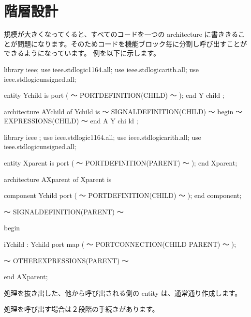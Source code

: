 \documentclass[letterpaper,10pt,dvipdfmx]{sphinxmanual}
\begin{document}
\begin{figure}[htbp]
\centering

\noindent{}
\end{figure}


\section{階層設計}
\label{\detokenize{05_try:id24}}
規模が大きくなってくると、すべてのコードを一つの architecture に書ききることが問題になります。そのためコードを機能ブロック毎に分割し呼び出すことができるようになっています。
例を以下に示します。

\begin{sphinxVerbatim}[commandchars=\\\{\}]
library ieee;
use ieee.std\PYGZus{}logic\PYGZus{}1164.all;
use ieee.std\PYGZus{}logic\PYGZus{}arith.all;
use ieee.std\PYGZus{}logic\PYGZus{}unsigned.all;

entity Y\PYGZus{}child is
  port (
  ～ PORT\PYGZus{}DEFINITION(CHILD) ～
  );
end Y child ;

architecture A\PYGZus{}Y\PYGZus{}child of Y\PYGZus{}child is
  ～ SIGNAL\PYGZus{}DEFINITION(CHILD) ～
begin
  ～ EXPRESSIONS(CHILD) ～
end A Y chi ld ;


library ieee ;
use ieee.std\PYGZus{}logic\PYGZus{}1164.all;
use ieee.std\PYGZus{}logic\PYGZus{}arith.all;
use ieee.std\PYGZus{}logic\PYGZus{}unsigned.all;

entity X\PYGZus{}parent is
  port (
    ～ PORT\PYGZus{}DEFINITION(PARENT) ～
  );
end X\PYGZus{}parent;

architecture A\PYGZus{}X\PYGZus{}parent of X\PYGZus{}parent is

  component Y\PYGZus{}child
    port (
      ～ PORT\PYGZus{}DEFINITION(CHILD) ～
    );
  end component;

  ～ SIGNAL\PYGZus{}DEFINITION(PARENT) ～

begin

  i\PYGZus{}Y\PYGZus{}child : Y\PYGZus{}child
    port map (
      ～ PORT\PYGZus{}CONNECTION(CHILD PARENT) ～
    );

  ～ OTHER\PYGZus{}EXPRESSIONS(PARENT) ～

end A\PYGZus{}X\PYGZus{}parent;
\end{sphinxVerbatim}

処理を抜き出した、他から呼び出される側の entity は、通常通り作成します。

処理を呼び出す場合は２段階の手続きがあります。
\end{document}
